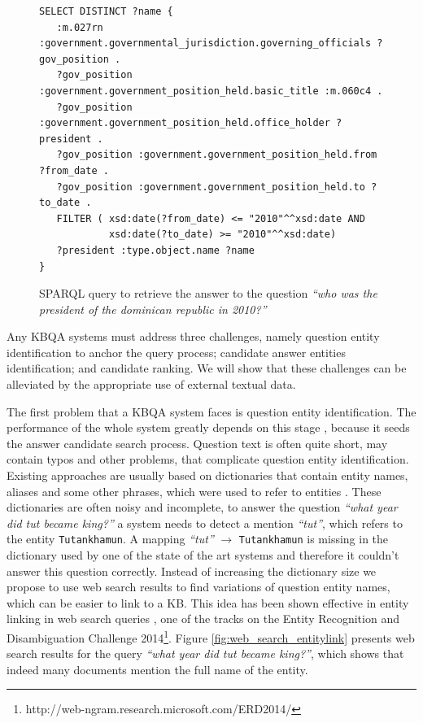 \begin{figure}
\centering
\begin{lstlisting}[frame=single,basicstyle=\small]
SELECT DISTINCT ?name {
   :m.027rn :government.governmental_jurisdiction.governing_officials ?gov_position .
   ?gov_position :government.government_position_held.basic_title :m.060c4 .
   ?gov_position :government.government_position_held.office_holder ?president .
   ?gov_position :government.government_position_held.from ?from_date .
   ?gov_position :government.government_position_held.to ?to_date .
   FILTER ( xsd:date(?from_date) <= "2010"^^xsd:date AND
            xsd:date(?to_date) >= "2010"^^xsd:date)
   ?president :type.object.name ?name
}
\end{lstlisting}
\vspace{-0.2cm}
\caption{SPARQL query to retrieve the answer to the question \textit{``who was the president of the dominican republic in 2010?''}}
\label{fig:example_sparql}
\vspace{-0.3cm}
\end{figure}

Any KBQA systems must address three challenges, namely question entity identification to anchor the query process; candidate answer entities identification; and candidate ranking.
We will show that these challenges can be alleviated by the appropriate use of external textual data. 

The first problem that a KBQA system faces is question entity identification.
The performance of the whole system greatly depends on this stage \cite{yao-scratch-qa-naacl2015}, because it seeds the answer candidate search process.
Question text is often quite short, may contain typos and other problems, that complicate question entity identification.
Existing approaches are usually based on dictionaries that contain entity names, aliases and some other phrases, which were used to refer to entities \cite{SPITKOVSKY12.266}.
These dictionaries are often noisy and incomplete, \eg to answer the question \textit{``what year did tut became king?''} a system needs to detect a mention \textit{``tut''}, which refers to the entity \texttt{Tutankhamun}.
A mapping \textit{``tut''} $\rightarrow$ \texttt{Tutankhamun} is missing in the dictionary used by one of the state of the art systems and therefore it couldn't answer this question correctly.
Instead of increasing the dictionary size we propose to use web search results to find variations of question entity names, which can be easier to link to a KB.
This idea has been shown effective in entity linking in web search queries \cite{SMAPH_ERD:2014}, one of the tracks on the Entity Recognition and Disambiguation Challenge 2014\footnote{http://web-ngram.research.microsoft.com/ERD2014/}.
Figure \ref{fig:web_search_entitylink} presents web search results for the query \textit{``what year did tut became king?''}, which shows that indeed many documents mention the full name of the entity.

